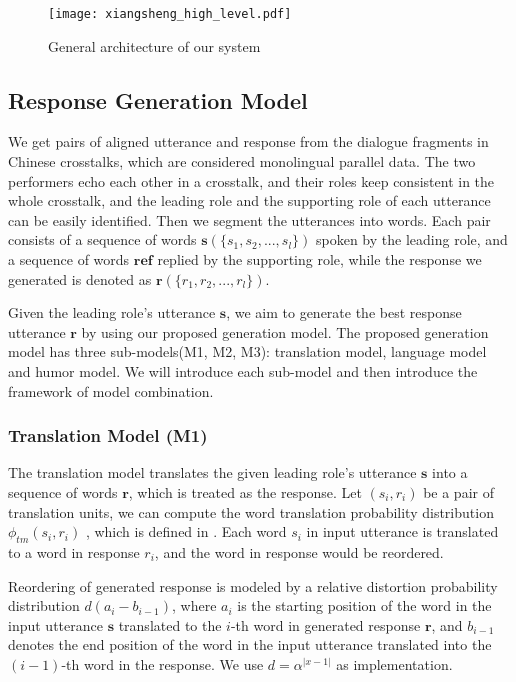 \documentclass[letterpaper]{article} %
\begin{document}
\begin{CJK*}{UTF8}{gbsn}
\begin{figure}[hbt]
	\texttt{[image: xiangsheng\_high\_level.pdf]}
	\caption{\label{fig:sys} General architecture of our system}
\end{figure}

\subsection{Response Generation Model}

We get pairs of aligned utterance and response from the dialogue fragments in Chinese crosstalks, which are considered monolingual parallel data. The two performers echo each other in a crosstalk, and their roles keep consistent in the whole crosstalk,  and the leading role and the supporting role of each utterance can be easily identified. Then we segment the utterances into words. Each pair consists of a sequence of words $\mathbf{s} (\{s_1, s_2, ..., s_l\})$ spoken by the leading role, and a sequence of words $\mathbf{ref}$ replied by the supporting role, while the response we generated is denoted as $\mathbf{r} (\{r_1, r_2, ..., r_l\})$.

Given the leading role's utterance $\mathbf{s}$, we aim to generate the best response utterance $\mathbf{r}$ by using our proposed generation model. The proposed generation model has three sub-models(M1, M2, M3): translation model, language model and humor model. We will introduce each sub-model and then introduce the framework of model combination. 

\subsubsection{Translation Model (M1)}

The translation model translates the given leading role's utterance $\mathbf{s}$ into a sequence of words $\mathbf{r}$, which is treated as the response. Let $({s}_i, {r}_i)$ be a pair of translation units, we can compute the word translation probability distribution $\phi_{tm}({s}_i, {r}_i)$ , which is defined in \cite{koehn2003statistical}. 
Each word $s_i$ in input utterance is translated to a word in response $r_i$, and the word in response would be reordered. 

Reordering of generated response is modeled by %
a relative distortion probability distribution $d(a_i - b_{i-1})$, where $a_i$ is the starting position of the word in the input utterance $\mathbf{s}$ translated to the $i$-th word in generated response $\mathbf{r}$, and $b_{i-1}$ denotes the end position of the word in the input utterance translated into the $(i-1)$-th word in the response. We use $d=\alpha^{|x-1|}$ as implementation.


\end{CJK*}
\end{document}

